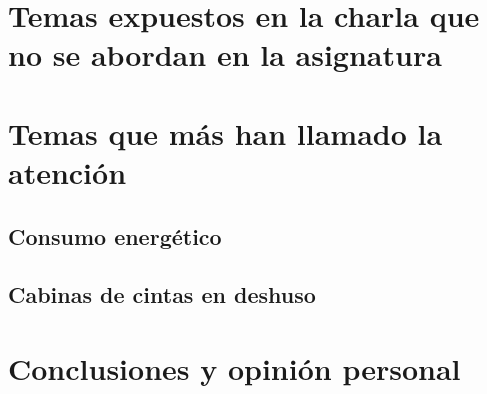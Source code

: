 \documentclass[a4paper,11pt]{article}
\begin{document}
\section{Temas expuestos en la charla que no se abordan en la asignatura}

\section{Temas que más han llamado la atención}
\subsection{Consumo energético}
\subsection{Cabinas de cintas en deshuso}

\section{Conclusiones y opinión personal}

\begin{thebibliography}{99}
\end{thebibliography}
\end{document}

